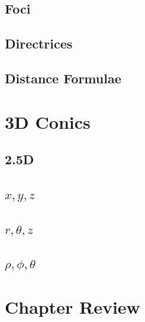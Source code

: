 \subsection{Foci}
\subsection{Directrices}
\subsection{Distance Formulae}

\newpage
\section{3D Conics}
\noindent{}
\subsection{2.5D}
\subsection{$x, y, z$}
\subsection{$r, \theta, z$}
\subsection{$\rho, \phi, \theta$}

\section{Chapter Review}